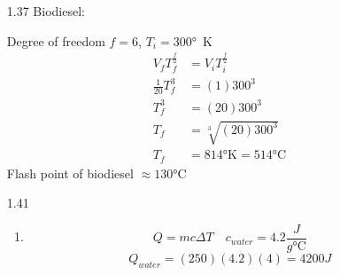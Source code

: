 \documentclass{article}
\begin{document}
\begin{enumerate}
\begin{align*}
        \end{align*}
        N, K, and f are constant
        \begin{align*}
            constant &= V^{\frac{2 + f}{2}} P^{\frac{f}{2}} \\
            constant^{\left( \frac{2}{f} \right)} &= V^{\frac{2}{f} \left(\frac{2 + f}{2} \right)} P^{\frac{2}{f}\frac{f}{2}} \\
            constant &= V^{\frac{2 + f}{f}} P \quad \gamma = \frac{2 + f}{f} \\
            constant &= V^\gamma P
        \end{align*}
    \vspace{0.1in}
    \item [1.37]
        Biodiesel:
        \begin{center}
        \end{center}
        Degree of freedom \(f = 6\), \(T_i = 300\)\si{\degree\kelvin}
        \begin{align*}
            V_f T_f^{\frac{f}{2}} &= V_i T_i^{\frac{f}{2}} \\
            \frac{1}{20} T_f^3 &= (1) 300^3 \\
            T_f^3 &= (20) 300^3 \\
            T_f &= \sqrt[3]{(20) 300^3} \\
            T_f &= 814\si{\degree\kelvin} = 514\si{\celsius}
        \end{align*}
        Flash point of biodiesel \(\approx 130\)\si{\celsius}
    \vspace{0.1in}
    \item [1.41]
    \begin{enumerate}
        \item
            \begin{equation*}
                Q = mc \Delta T \quad c_{water} = 4.2 \frac{J}{g\si{\celsius}}
            \end{equation*}
            \begin{equation*}
                Q_{water} = (250)(4.2)(4) = 4200J
            \end{equation*}
        \vspace{0.05in}

\end{enumerate}
\end{enumerate}
\end{document}

